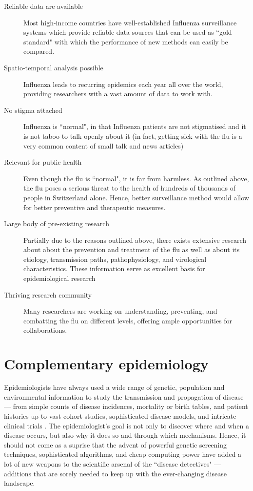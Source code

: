 \documentclass[11pt, a4paper,twoside]{report}\usepackage[]{graphicx}\usepackage[]{color}
\begin{document}
\begin{description}
\item [Reliable data are available] Most high-income countries have well-established Influenza surveillance systems which provide reliable data sources that can be used as ``gold standard" with which the performance of new methods can easily be compared.
\item [Spatio-temporal analysis possible] Influenza leads to recurring epidemics each year all over the world, providing researchers with a vast amount of data to work with.
\item [No stigma attached] Influenza is ``normal", in that Influenza patients are not stigmatised and it is not taboo to talk openly about it (in fact, getting sick with the flu is a very common content of small talk and news articles)
\item [Relevant for public health ] Even though the flu is ``normal", it is far from harmless. As outlined above, the flu poses a serious threat to the health of hundreds of thousands of people in Switzerland alone. Hence, better surveillance method would allow for better preventive and therapeutic measures.
\item [Large body of pre-existing research] Partially due to the reasons outlined above, there exists extensive research about about the prevention and treatment of the flu as well as about its etiology, transmission paths, pathophysiology, and virological characteristics. These information serve as excellent basis for epidemiological research
\item [Thriving research community] Many researchers are working on understanding, preventing, and combatting the flu on different levels, offering ample opportunities for collaborations.
\end{description}

\section{Complementary epidemiology}
Epidemiologists have always used a wide range of genetic, population and environmental information to study the transmission and propagation of disease --- from simple counts of disease incidences, mortality or birth tables, and patient histories up to vast cohort studies, sophisticated disease models, and intricate clinical trials \citep{rothman2012epidemiology,koepsell2014epidemiologic}. The epidemiologist's goal is not only to discover where and when a disease occurs, but also why it does so and through which mechanisms. Hence, it should not come as a suprise that the advent of powerful genetic screening techniques, sophisticated algorithms, and cheap computing power have added a lot of new weapons to the scientific arsenal of the ``disease detectives" \citep{bailey2005introduction, khoury_transforming_2013, gardy_real-time_2015} --- additions that are sorely needed to keep up with the ever-changing disease landscape.
\end{document}
